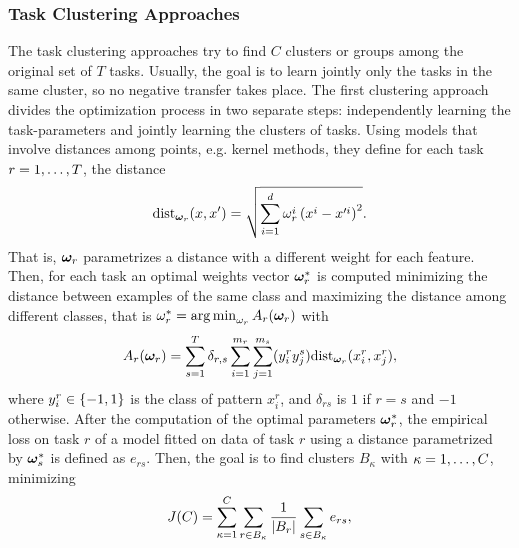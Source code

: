 \subsubsection{Task Clustering Approaches}
The task clustering approaches try to find $C$ clusters or groups among the original set of $T$ tasks. Usually, the goal is to learn jointly only the tasks in the same cluster, so no negative transfer takes place.
The first clustering approach~\citep{ThrunO96} divides the optimization process in two separate steps: independently learning the task-parameters and jointly learning the clusters of tasks.
Using models that involve distances among points, e.g. kernel methods, they define for each task $r=1, \ldots, T$, the distance
$$ \text{dist}_{\bm{\omega}_r}(x, x') = \sqrt{\sum_{i=1}^d \omega_r^i \left( x^i - x'^i \right)^2}. $$
That is, $\bm{\omega}_r$ parametrizes a distance with a different weight for each feature.
Then, for each task an optimal weights vector $\bm{\omega}_r^*$ is computed minimizing the distance between examples of the same class and maximizing the distance among different classes, that is ${\omega}^*_r = \operatorname*{arg\min}_{\omega_r} A_r(\bm{\omega}_r)$ with
\begin{equation}
    \nonumber
    A_r(\bm{\omega}_r) = \sum_{s=1}^T \delta_{r, s} \sum_{i=1}^{m_r} \sum_{j=1}^{m_s} (y_i^r  y_j^s)  \text{dist}_{\bm{\omega}_r}(x_i^r, x_j^r),
\end{equation}
where $y_i^r \in \left\{-1, 1\right\}$ is the class of pattern $x_i^r$, and $\delta_{rs}$ is $1$ if $r=s$ and $-1$ otherwise.
After the computation of the optimal parameters $\bm{\omega}_r^*$, the empirical loss on task $r$ of a model fitted on data of task $r$ using a distance parametrized by $\bm{\omega}_s^*$ is defined as $e_{rs}$. Then, the goal is to find clusters $B_\kappa$ with $\kappa=1, \ldots, C$, minimizing
\begin{equation}
    \nonumber
    J(C) = \sum_{\kappa = 1}^C \sum_{r \in B_\kappa} \frac{1}{\left|B_r\right|} \sum_{s \in B_\kappa} e_{rs} ,
\end{equation}
